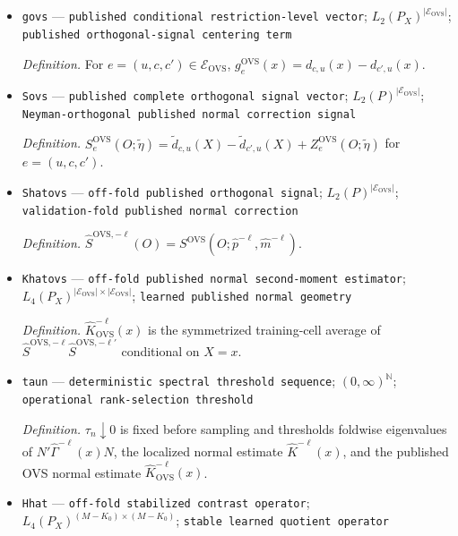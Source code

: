 \documentclass{article}
\begin{document}
\begin{itemize}
  \item \texttt{govs} --- \texttt{published conditional restriction-\allowbreak{}level vector}; \(L_2(P_X)^{|\mathcal E_{\mathrm{OVS}}|}\); \texttt{published orthogonal-\allowbreak{}signal centering term}
  \par\smallskip\noindent\emph{Definition.} For \(e=(u,c,c')\in\mathcal E_{\mathrm{OVS}}\), \(g_e^{\mathrm{OVS}}(x)=d_{c,u}(x)-d_{c',u}(x)\).
  \item \texttt{Sovs} --- \texttt{published complete orthogonal signal vector}; \(L_2(P)^{|\mathcal E_{\mathrm{OVS}}|}\); \texttt{Neyman-\allowbreak{}orthogonal published normal correction signal}
  \par\smallskip\noindent\emph{Definition.} \(S_e^{\mathrm{OVS}}(O;\widetilde\eta)=\widetilde d_{c,u}(X)-\widetilde d_{c',u}(X)+Z_e^{\mathrm{OVS}}(O;\widetilde\eta)\) for \(e=(u,c,c')\).
  \item \texttt{Shatovs} --- \texttt{off-\allowbreak{}fold published orthogonal signal}; \(L_2(P)^{|\mathcal E_{\mathrm{OVS}}|}\); \texttt{validation-\allowbreak{}fold published normal correction}
  \par\smallskip\noindent\emph{Definition.} \(\widehat S^{\mathrm{OVS},-\ell}(O)=S^{\mathrm{OVS}}(O;\widehat p^{-\ell},\widehat m^{-\ell})\).
  \item \texttt{Khatovs} --- \texttt{off-\allowbreak{}fold published normal second-\allowbreak{}moment estimator}; \(L_4(P_X)^{|\mathcal E_{\mathrm{OVS}}|\times|\mathcal E_{\mathrm{OVS}}|}\); \texttt{learned published normal geometry}
  \par\smallskip\noindent\emph{Definition.} \(\widehat K_{\mathrm{OVS}}^{-\ell}(x)\) is the symmetrized training-cell average of \(\widehat S^{\mathrm{OVS},-\ell}\widehat S^{\mathrm{OVS},-\ell\prime}\) conditional on \(X=x\).
  \item \texttt{taun} --- \texttt{deterministic spectral threshold sequence}; \((0,\infty)^{\mathbb N}\); \texttt{operational rank-\allowbreak{}selection threshold}
  \par\smallskip\noindent\emph{Definition.} \(\tau_n\downarrow0\) is fixed before sampling and thresholds foldwise eigenvalues of \(N'\widehat\Gamma^{-\ell}(x)N\), the localized normal estimate \(\widehat K^{-\ell}(x)\), and the published OVS normal estimate \(\widehat K_{\mathrm{OVS}}^{-\ell}(x)\).
  \item \texttt{Hhat} --- \texttt{off-\allowbreak{}fold stabilized contrast operator}; \(L_4(P_X)^{(M-K_0)\times(M-K_0)}\); \texttt{stable learned quotient operator}

\end{itemize}
\end{document}
